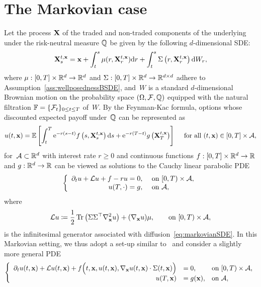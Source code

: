 \section{The Markovian case}\label{sec:markovian_case}
Let the process $\mathbf{X}$ of the traded and non-traded components of the underlying under the risk-neutral measure $\mathbb{Q}$ be given by the following $d$-dimensional SDE:
\begin{equation}\label{eq:markovianSDE}
\mathbf{X}_s^{t,\mathbf{x}} = \mathbf{x} + \int_t^s \mu(r, \mathbf{X}_r^{t,\mathbf{x}})\mathrm{d} r
+ \int_t^s \Sigma\left(r, \mathbf{X}_r^{t,\mathbf{x}}\right)\mathrm{d} W_r,
\end{equation}
where $\mu: [0, T]\times\mathbb{R}^d\rightarrow\mathbb{R}^d$
and $\Sigma:[0, T]\times\mathbb{R}^d\rightarrow\mathbb{R}^{d\times d}$ adhere to Assumption~\ref{ass:wellposednessBSDE}, 
and~$W$ is a standard $d$-dimensional Brownian motion on the probability space $(\Omega, \mathcal{F}, \mathbb{Q})$ equipped
with the natural filtration $\mathbb{F} = \{\mathcal{F}_t\}_{0\leq t\leq T}$ of~$W$. 
By the Feynman-Kac formula, options whose discounted expected payoff under~$\mathbb{Q}$ can be represented as
\begin{equation}
    u(t, \mathbf{x})=\mathbb{E}\left[\int_t^T \mathrm{e}^{-r(s-t)} f\left(s, \mathbf{X}_s^{t, \mathbf{x}}\right) \mathrm{d} s + \mathrm{e}^{-r(T-t)} g\left(\mathbf{X}_T^{t, \mathbf{x}}\right)\right]\quad \textup{ for all } (t, \mathbf{x}) \in[0, T] \times \mathcal{A},
\end{equation}
for~$\mathcal{A}\subset\mathbb{R}^d$ with interest rate $r\geq 0$ and continuous functions $f:[0,T]\times\mathbb{R}^d\to\mathbb{R}$
and $g:\mathbb{R}^d\to\mathbb{R}$ can be viewed as solutions to the Cauchy linear parabolic PDE
\begin{equation*}
\left\{
\begin{array}{rl}
\partial_t u + \mathcal{L} u + f - ru= 0, & \text { on }[0, T) \times \mathcal{A}, \\
u(T, \cdot)= g, & \text { on } \mathcal{A},
\end{array}
\right.
\end{equation*}
where
\begin{align}\label{eq:infinitesimal_generator}
\mathcal{L} u \coloneqq \frac{1}{2}\operatorname{Tr}
\left(\Sigma\Sigma^\top \nabla_{\mathbf{x}}^2 u\right) +  (\nabla_{\mathbf{x}} u)\mu,
\qquad\text{on }[0,T)\times \mathcal{A},
\end{align}
is the infinitesimal generator associated with diffusion~\eqref{eq:markovianSDE}.
In this Markovian setting, we thus adopt a set-up similar to~\cite{Hure2020DeepPDEs} and consider a slightly more general PDE
\begin{equation}\label{eq:markovianPDE}
\left\{
\begin{array}{rll}
    \partial_t u(t,\mathbf{x}) + \mathcal{L} u(t,\mathbf{x}) + 
    f\Big(t, \mathbf{x}, u(t,\mathbf{x}), \nabla_{\mathbf{x}} u(t,\mathbf{x}) \cdot \Sigma(t,\mathbf{x})\Big) &= 0, & \text{on }[0, T) \times \mathcal{A},\\
     u(T, \mathbf{x}) &= g(\mathbf{x}), & \text{on }\mathcal{A},
\end{array}
\right.
\end{equation}
